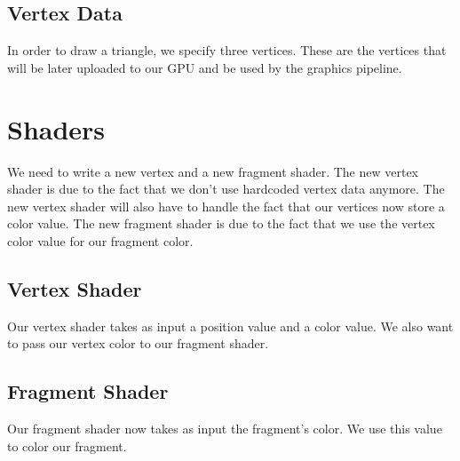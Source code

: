 \subsection{Vertex Data}

In order to draw a triangle, we specify three vertices.
These are the vertices that will be later uploaded to our GPU and be used
by the graphics pipeline.

\begin{minipage}{\linewidth}{\noindent}
    
\end{minipage}

\section{Shaders}

We need to write a new vertex and a new fragment shader.
The new vertex shader is due to the fact that we don't use
hardcoded vertex data anymore.
The new vertex shader will also have to handle the fact that
our vertices now store a color value.
The new fragment shader is due to the fact that we use the
vertex color value for our fragment color.

\subsection{Vertex Shader}

Our vertex shader takes as input a position value and a color value.
We also want to pass our vertex color to our fragment shader.

\begin{minipage}{\linewidth}{\noindent}
    
\end{minipage}

\subsection{Fragment Shader}

Our fragment shader now takes as input the fragment's color.
We use this value to color our fragment.

\begin{minipage}{\linewidth}{\noindent}
    
\end{minipage}

